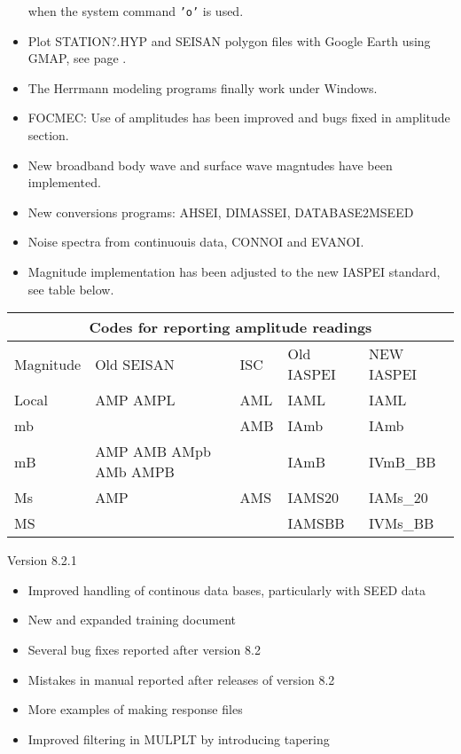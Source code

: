 \begin{itemize}
when the system command \texttt{'o'} is used.
\item Plot STATION?.HYP and SEISAN polygon files with Google Earth using GMAP, see page \pageref{subs:gmap}.
\item The Herrmann modeling programs finally work under Windows.
\item FOCMEC: Use of amplitudes has been improved and bugs fixed in amplitude section.
\item New broadband body wave and surface wave magntudes have been implemented.
\item New conversions programs: AHSEI, DIMASSEI, DATABASE2MSEED
\item Noise spectra from continuouis data, CONNOI and EVANOI.
\item Magnitude implementation has been adjusted to the new IASPEI standard, see table below.
\end{itemize}

\begin{tabular}{|l|l|l|l|l|}
\hline
\multicolumn{5}{|c|}{Codes for reporting amplitude readings} \\
\hline
Magnitude  & Old SEISAN & ISC & Old IASPEI & NEW IASPEI \\ \hline
Local & AMP AMPL & AML & IAML & IAML  \\ \hline
mb &  & AMB & IAmb & IAmb  \\ \hline
mB & AMP AMB AMpb AMb AMPB &  & IAmB & IVmB\_BB  \\ \hline
Ms & AMP & AMS & IAMS20 & IAMs\_20  \\ \hline
MS &  &  & IAMSBB & IVMs\_BB  \\ \hline
\end{tabular}


Version 8.2.1 
\begin{itemize}
\item Improved handling of continous data bases, particularly with SEED data 
\item New and expanded training document 
\item Several bug fixes reported after version 8.2 
\item Mistakes in manual reported after releases of version 8.2 
\item More examples of making response files 
\item Improved filtering in MULPLT by introducing tapering 
\end{itemize}

